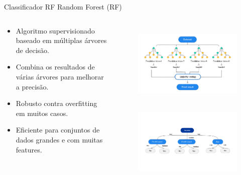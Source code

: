 \begin{frame}[c]{Classificador RF}
    Random Forest (RF)
    \begin{columns}[c]
        \begin{column}{0.48\linewidth}
            \vspace{-1.5cm} %
            \begin{itemize}
                \item Algoritmo supervisionado baseado em múltiplas árvores de decisão.
                \item Combina os resultados de várias árvores para melhorar a precisão.
                \item Robusto contra overfitting em muitos casos.
                \item Eficiente para conjuntos de dados grandes e com muitas features.
            \end{itemize}
        \end{column}
        \begin{column}{0.48\linewidth}
            \vspace{-1cm} %
            \begin{figure}
                \centering
                \includegraphics[height=4cm]{images/rf_example1.png}
                \includegraphics[height=4cm]{images/rf_example2.png}
            \end{figure}
        \end{column}
    \end{columns}
\end{frame}

